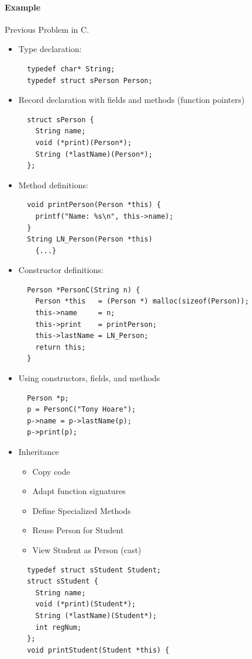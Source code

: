 \paragraph{Example} Previous Problem in C.
\begin{itemize}
 \item Type declaration:
 \begin{lstlisting}
  typedef char* String;
  typedef struct sPerson Person;
 \end{lstlisting}
 \item Record declaration with fields and methods (function pointers)
 \begin{lstlisting}
  struct sPerson {
    String name;
    void (*print)(Person*);
    String (*lastName)(Person*);
  };
 \end{lstlisting}
 \item Method definitions:
 \begin{lstlisting}
  void printPerson(Person *this) {
    printf("Name: %s\n", this->name);
  }
  String LN_Person(Person *this)
    {...}
 \end{lstlisting}
 \item Constructor definitions:
 \begin{lstlisting}
  Person *PersonC(String n) {
    Person *this   = (Person *) malloc(sizeof(Person));
    this->name     = n;
    this->print    = printPerson;
    this->lastName = LN_Person;
    return this;
  }
 \end{lstlisting}
 \item Using constructors, fields, and methods
 \begin{lstlisting}
  Person *p;
  p = PersonC("Tony Hoare");
  p->name = p->lastName(p);
  p->print(p);
 \end{lstlisting}
 \item Inheritance
  \begin{itemize}
   \item Copy code
   \item Adapt function signatures
   \item Define Specialized Methods
   \item Reuse Person for Student
   \item View Student as Person (cast)
  \end{itemize}
 \begin{lstlisting}
  typedef struct sStudent Student;
  struct sStudent {
    String name;
    void (*print)(Student*);
    String (*lastName)(Student*);
    int regNum;
  };
  void printStudent(Student *this) {

\end{lstlisting}
\end{itemize}
